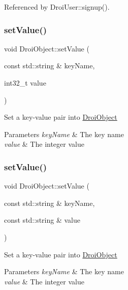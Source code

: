 Referenced by Droi\+User\+::signup().

\mbox{\label{class_droi_object_ab3ae056f106db7858aae570827ac58a9}} 
\subsubsection{\texorpdfstring{set\+Value()}{setValue()}\hspace{0.1cm}{\footnotesize\ttfamily [2/11]}}
{\footnotesize\ttfamily void Droi\+Object\+::set\+Value (\begin{DoxyParamCaption}\item[{const std\+::string \&}]{key\+Name,  }\item[{int32\+\_\+t}]{value }\end{DoxyParamCaption})}

Set a key-\/value pair into \hyperlink{class_droi_object}{Droi\+Object} 
\begin{DoxyParams}{Parameters}
{\em key\+Name} & The key name \\
\hline
{\em value} & The integer value \\
\hline
\end{DoxyParams}
\mbox{\label{class_droi_object_a6cdc5a7db3146a6d1ee9b3ceb6d1dfb4}} 
\subsubsection{\texorpdfstring{set\+Value()}{setValue()}\hspace{0.1cm}{\footnotesize\ttfamily [3/11]}}
{\footnotesize\ttfamily void Droi\+Object\+::set\+Value (\begin{DoxyParamCaption}\item[{const std\+::string \&}]{key\+Name,  }\item[{const std\+::string \&}]{value }\end{DoxyParamCaption})}

Set a key-\/value pair into \hyperlink{class_droi_object}{Droi\+Object} 
\begin{DoxyParams}{Parameters}
{\em key\+Name} & The key name \\
\hline
{\em value} & The integer value \\
\hline
\end{DoxyParams}
\mbox{\label{class_droi_object_adf2252384ee3ab34c61b622eab4b982c}} 
